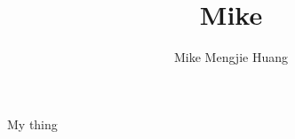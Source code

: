 \documentclass[xcolor=x11names,table]{report}
\title{Mike}
\author{Mike Mengjie Huang}
\begin{document}
\maketitle
\tableofcontents

My thing
\end{document}

